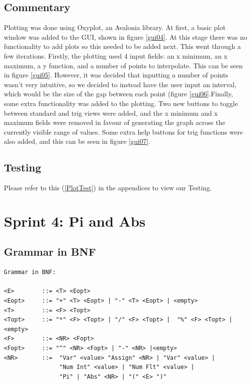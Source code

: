 \documentclass[a4paper, oneside, 11pt]{report}
\begin{document}
    \subsection{Commentary}
    Plotting was done using Oxyplot, an Avalonia library. At first, a basic plot window was added to the GUI, shown in figure \ref{gui04}. At this stage there was no functionality to add plots so this needed to be added next. This went through a few iterations. Firstly, the plotting used 4 input fields: an x minimum, an x maximum, a y function, and a number of points to interpolate. This can be seen in figure \ref{gui05}. However, it was decided that inputting a number of points wasn't very intuitive, so we decided to instead have the user input an interval, which would be the size of the gap between each point (figure \ref{gui06}.\newline Finally, some extra functionality was added to the plotting. Two new buttons to toggle between standard and trig views were added, and the x minimum and x maximum fields were removed in favour of generating the graph across the currently visible range of values. Some extra help buttons for trig functions were also added, and this can be seen in figure \ref{gui07}.

    \subsection{Testing}
    Please refer to this (\ref{PlotTest}) in the appendices to view our Testing. \\

    \clearpage

    \section{Sprint 4: Pi and Abs}
    \subsection{Grammar in BNF}
    \begin{verbatim}
Grammar in BNF:

<E>        ::= <T> <Eopt>
<Eopt>     ::= "+" <T> <Eopt> | "-" <T> <Eopt> | <empty>
<T>        ::= <F> <Topt>
<Topt>     ::= "*" <F> <Topt> | "/" <F> <Topt> |  "%" <F> <Topt> |<empty>
<F>        ::= <NR> <Fopt>
<Fopt>     ::= "^" <NR> <Fopt> | "-" <NR> |<empty>
<NR>       ::=  "Var" <value> "Assign" <NR> | "Var" <value> |
                "Num Int" <value> | "Num Flt" <value> |
                "Pi" | "Abs" <NR> | "(" <E> ")"
    \end{verbatim}
\end{document}
